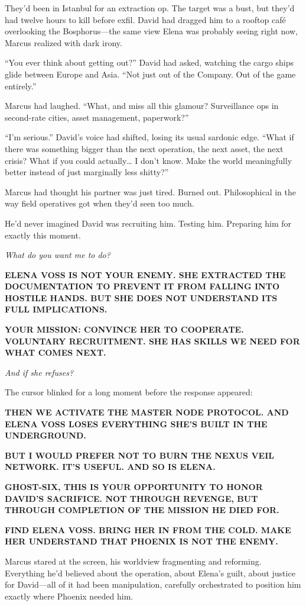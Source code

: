 They'd been in Istanbul for an extraction op. The target was a bust, but they'd had twelve hours to kill before exfil. David had dragged him to a rooftop café overlooking the Bosphorus---the same view Elena was probably seeing right now, Marcus realized with dark irony.

``You ever think about getting out?'' David had asked, watching the cargo ships glide between Europe and Asia. ``Not just out of the Company. Out of the game entirely.''

Marcus had laughed. ``What, and miss all this glamour? Surveillance ops in second-rate cities, asset management, paperwork?''

``I'm serious.'' David's voice had shifted, losing its usual sardonic edge. ``What if there was something bigger than the next operation, the next asset, the next crisis? What if you could actually\ldots{} I don't know. Make the world meaningfully better instead of just marginally less shitty?''

Marcus had thought his partner was just tired. Burned out. Philosophical in the way field operatives got when they'd seen too much.

He'd never imagined David was recruiting him. Testing him. Preparing him for exactly this moment.

\emph{What do you want me to do?}

\textbf{ELENA VOSS IS NOT YOUR ENEMY. SHE EXTRACTED THE DOCUMENTATION TO PREVENT IT FROM FALLING INTO HOSTILE HANDS. BUT SHE DOES NOT UNDERSTAND ITS FULL IMPLICATIONS.}

\textbf{YOUR MISSION: CONVINCE HER TO COOPERATE. VOLUNTARY RECRUITMENT. SHE HAS SKILLS WE NEED FOR WHAT COMES NEXT.}

\emph{And if she refuses?}

The cursor blinked for a long moment before the response appeared:

\textbf{THEN WE ACTIVATE THE MASTER NODE PROTOCOL. AND ELENA VOSS LOSES EVERYTHING SHE'S BUILT IN THE UNDERGROUND.}

\textbf{BUT I WOULD PREFER NOT TO BURN THE NEXUS VEIL NETWORK. IT'S USEFUL. AND SO IS ELENA.}

\textbf{GHOST-SIX, THIS IS YOUR OPPORTUNITY TO HONOR DAVID'S SACRIFICE. NOT THROUGH REVENGE, BUT THROUGH COMPLETION OF THE MISSION HE DIED FOR.}

\textbf{FIND ELENA VOSS. BRING HER IN FROM THE COLD. MAKE HER UNDERSTAND THAT PHOENIX IS NOT THE ENEMY.}

Marcus stared at the screen, his worldview fragmenting and reforming. Everything he'd believed about the operation, about Elena's guilt, about justice for David---all of it had been manipulation, carefully orchestrated to position him exactly where Phoenix needed him.

